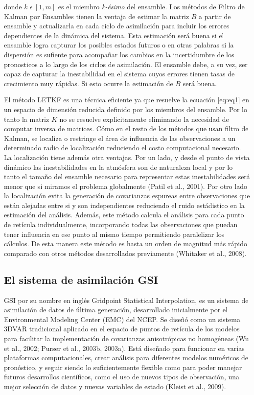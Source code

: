 \documentclass[12pt,oneside]{reedthesis}
\begin{document}
donde \(k \; \epsilon \; [1,m]\) es el miembro \emph{k-ésimo} del ensamble. Los métodos de Filtro de Kalman por Ensambles tienen la ventaja de estimar la matriz \(B\) a partir de ensamble y actualizarla en cada ciclo de asimilación para incluir los errores dependientes de la dinámica del sistema.
Esta estimación será buena si el ensamble logra capturar los posibles estados futuros o en otras palabras si la dispersión es sufiente para acompañar los cambios en la incertidumbre de los pronosticos a lo largo de los ciclos de asimilación. El ensamble debe, a su vez, ser capaz de capturar la inestabilidad en el sistema cuyos errores tienen tasas de crecimiento muy rápidas. Si esto ocurre la estimación de \(B\) será buena.

El método LETKF es una técnica eficiente ya que resuelve la ecuación \eqref{eq:eq1} en un espacio de dimensión reducida definido por los miembros del ensamble. Por lo tanto la matriz \(K\) no se resuelve explicitamente eliminando la necesidad de computar inversa de matrices. Cómo en el resto de los métodos que usan filtro de Kalman, se localiza o restringe el área de influencia de las observaciones a un determinado radio de localización reduciendo el costo computacional necesario. La localización tiene además otra ventajas. Por un lado, y desde el punto de vista dinámico las inestabilidades en la atmósfera son de naturaleza local y por lo tanto el tamaño del ensamble necesario para representar estas inestabilidades será menor que si miramos el problema globalmente (Patil et al., 2001). Por otro lado la localización evita la generación de covarianzas espureas entre observaciones que están alejadas entre si y son independientes reduciendo el ruido estádistico en la estimación del análisis. Además, este método calcula el análisis para cada punto de retícula individualmente, incorporando todas las observaciones que puedan tener influencia en ese punto al mismo tiempo permitiendo paralelizar los cálculos. De esta manera este método es hasta un orden de magnitud más rápido comparado con otros métodos desarrollados previamente (Whitaker et al., 2008).

\hypertarget{el-sistema-de-asimilaciuxf3n-gsi}{%
\subsection{El sistema de asimilación GSI}\label{el-sistema-de-asimilaciuxf3n-gsi}}

GSI por su nombre en inglés Gridpoint Statistical Interpolation, es un sistema de asimilación de datos de última generación, desarrollado inicialmente por el Environmental Modeling Center (EMC) del NCEP. Se diseñó como un sistema 3DVAR tradicional aplicado en el espacio de puntos de retícula de los modelos para facilitar la implementación de covarianzas anisotrópicas no homogéneas (Wu et al., 2002; Purser et al., 2003b, 2003a).
Está diseñado para funcionar en varias plataformas computacionales, crear análisis para diferentes modelos numéricos de pronóstico, y seguir siendo lo suficientemente flexible como para poder manejar futuros desarrollos científicos, como el uso de nuevos tipos de observación, una mejor selección de datos y nuevas variables de estado (Kleist et al., 2009).
\end{document}
